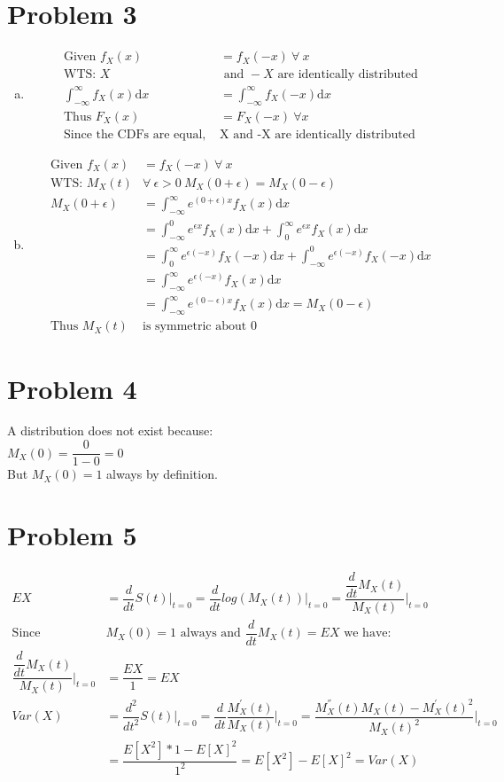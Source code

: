 \documentclass{article}
\newcommand{\dx}{\mathrm{d}x}
\begin{document}
\begin{flushleft}
\section*{Problem 3}
\begin{enumerate}[(a)]
\item 
\begin{align*}
\text{Given } f_X(x)&=f_X(-x) \ \forall \ x\\
 \text{WTS: } X &\text{ and } -X \text{ are identically distributed}\\
\int_{-\infty}^{\infty}f_X(x) \dx&=\int_{-\infty}^{\infty}f_X(-x) \dx\\
\text{Thus } F_X(x)&=F_X(-x) \ \forall x\\
\text{Since the CDFs are equal, } & \text{X and -X are identically distributed}
\end{align*}
\item 
\begin{align*}
\text{Given } f_X(x)&=f_X(-x) \ \forall \ x\\
\text{WTS: } M_X(t)& \forall \ \epsilon >0 \ M_X(0+\epsilon)=M_X(0-\epsilon)\\
M_X(0+\epsilon)&=\int_{-\infty}^{\infty}e^{(0+\epsilon)x}f_X(x)\dx\\
&=\int_{-\infty}^{0}e^{\epsilon x}f_X(x)\dx+\int_{0}^{\infty}e^{\epsilon x}f_X(x)\dx\\
&=\int_{0}^{\infty}e^{\epsilon(-x)}f_X(-x)\dx +\int_{-\infty}^{0}e^{\epsilon(-x)}f_X(-x)\dx\\
&=\int_{-\infty}^{\infty}e^{\epsilon (-x)}f_X(x)\dx\\
&=\int_{-\infty}^{\infty}e^{(0-\epsilon) x}f_X(x) \dx=M_X(0-\epsilon)\\
\text{Thus } M_X(t)& \text{is symmetric about } 0
\end{align*}
\end{enumerate}
\pagebreak
\section*{Problem 4}
A distribution does not exist because:\\
$M_X(0)=\dfrac{0}{1-0}=0$\\
But $M_X(0)=1$ always by definition.
\section*{Problem 5}
\begin{align*}
EX&=\dfrac{d}{dt}S(t)\bigg|_{t=0}=\dfrac{d}{dt} log(M_X(t))\bigg|_{t=0}=\dfrac{\dfrac{d}{dt}M_X(t)}{M_X(t)}\bigg|_{t=0}\\
\text{Since } &M_X(0)=1 \text{ always and }
\dfrac{d}{dt}M_X(t)=EX \text{ we have:}\\
\dfrac{\dfrac{d}{dt}M_X(t)}{M_X(t)}\bigg|_{t=0}&=\dfrac{EX}{1}=EX\\
Var(X)&=\dfrac{d^2}{{dt}^2}S(t)\bigg|_{t=0}=\dfrac{d}{dt}\dfrac{M^{'}_X(t)}{M_X(t)}\bigg|_{t=0}=\dfrac{M^{''}_X(t)M_X(t)-M^{'}_X(t)^2}{M_X(t)^2}\bigg|_{t=0}\\
&=\dfrac{E[X^2]*1-E[X]^2}{1^2}=E[X^2]-E[X]^2=Var(X)
\end{align*}

\end{flushleft}
\end{document}
